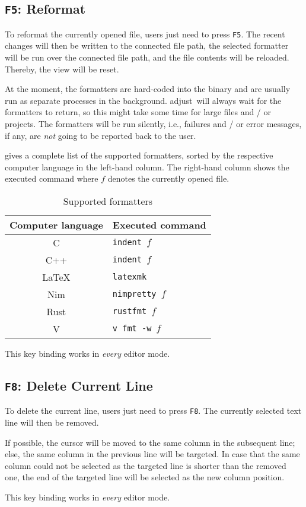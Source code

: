 \documentclass[11pt, a4paper, british]{scrartcl}
\DeclareRobustCommand{\adjust}{\textsf{adjust}}
\begin{document}
\subsection{\texttt{F5}:  Reformat}
\label{sec:f5-reformat}
To reformat the currently opened file, users just need to press \texttt{F5}.
The recent changes will then be written to the connected file path, the selected
formatter will be run over the connected file path, and the file contents will
be reloaded.  Thereby, the view will be reset.

At the moment, the formatters are hard-coded into the binary and are usually run
as separate processes in the background.  \adjust\ will always wait for the
formatters to return, so this might take some time for large files and / or
projects.  The formatters will be run silently, i.e., failures and / or error
messages, if any, are \emph{not} going to be reported back to the user.

 gives a complete list of the supported formatters, sorted
by the respective computer language in the left-hand column.  The right-hand
column shows the executed command where \texttt{$f$} denotes the currently
opened file.

\begin{table}
\centering
\caption{Supported formatters}
\label{tab:formatters}
\begin{tabular}{cl}
\toprule
Computer language   & Executed command          \\
\midrule
C                   & \texttt{indent $f$}       \\
C++                 & \texttt{indent $f$}       \\
\LaTeX              & \texttt{latexmk}          \\
Nim                 & \texttt{nimpretty $f$}    \\
Rust                & \texttt{rustfmt $f$}      \\
V                   & \texttt{v fmt -w $f$}     \\
\bottomrule
\end{tabular}
\end{table}

This key binding works in \emph{every} editor mode.

\subsection{\texttt{F8}:  Delete Current Line}
\label{sec:f8-delete-current-line}
To delete the current line, users just need to press \texttt{F8}.  The currently
selected text line will then be removed.

If possible, the cursor will be moved to the same column in the subsequent line;
else, the same column in the previous line will be targeted.  In case that the
same column could not be selected as the targeted line is shorter than the
removed one, the end of the targeted line will be selected as the new column
position.

This key binding works in \emph{every} editor mode.

\end{document}
